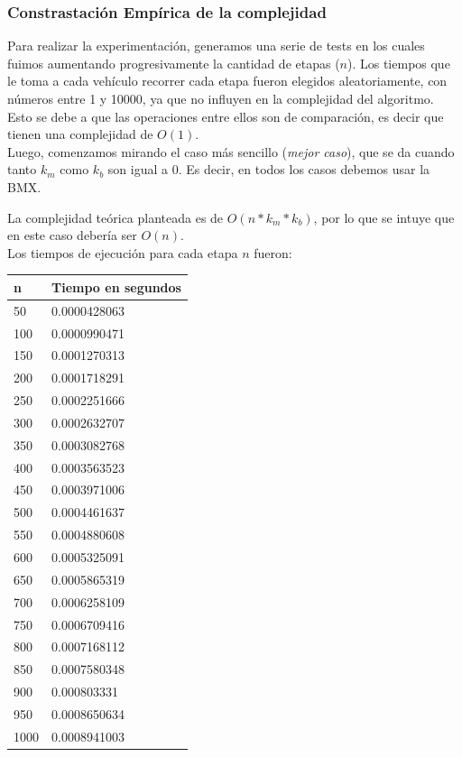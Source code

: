 \subsubsection{Constrastaci\'on Emp\'irica de la complejidad}


Para realizar la experimentaci\'on, generamos una serie de tests en los cuales fuimos aumentando progresivamente la cantidad de etapas ($n$).
Los tiempos que le toma a cada veh\'iculo recorrer cada etapa fueron elegidos aleatoriamente, con n\'umeros entre 1 y 10000, ya que no influyen en la complejidad del algoritmo. 
Esto se debe a que las operaciones entre ellos son de comparaci\'on, es decir que tienen una complejidad de $O(1)$.\\

Luego, comenzamos mirando el caso m\'as sencillo (\emph{mejor caso}), que se da cuando tanto $k_m$ como $k_b$ son igual a 0. Es decir, en todos los casos debemos usar la BMX. 
  
  La complejidad te\'orica planteada es de $O(n * k_m * k_b)$, por lo que se intuye que en este caso deber\'ia ser $O(n)$.\\
  
  Los tiempos de ejecuci\'on para cada etapa $n$ fueron:
  
  \begin{table}[htb]
  \centering
  \begin{tabular}[c]{|l|l|}

		\hline
n & Tiempo en segundos\\
		\hline
50	&	0.0000428063\\
		\hline
100	&	0.0000990471\\
		\hline
150	&	0.0001270313\\
		\hline
200	&	0.0001718291\\
		\hline
250	&	0.0002251666\\
		\hline
300	&	0.0002632707\\
		\hline
350	&	0.0003082768\\
		\hline
400	&	0.0003563523\\
		\hline
450	&	0.0003971006\\
		\hline
500	&	0.0004461637\\
		\hline
550	&	0.0004880608\\
		\hline
600	&	0.0005325091\\
		\hline
650	&	0.0005865319\\
		\hline
700	&	0.0006258109\\
		\hline
750	&	0.0006709416\\
		\hline
800	&	0.0007168112\\
		\hline
850	&	0.0007580348\\
		\hline
900	&	0.000803331\\
		\hline
950	&	0.0008650634\\
		\hline
1000	&	0.0008941003\\
		\hline

	\end{tabular}
	\end{table}

